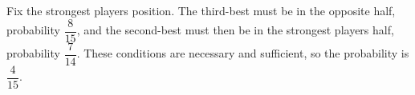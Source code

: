Fix the strongest player\textquotesingle s position. The third-best must be in the opposite half, probability $\dfrac{8}{15}$, and the second-best must then be in the strongest player\textquotesingle s half, probability $\dfrac{7}{14}$. These conditions are necessary and sufficient, so the probability is $\boxed{\dfrac{4}{15}}$.
